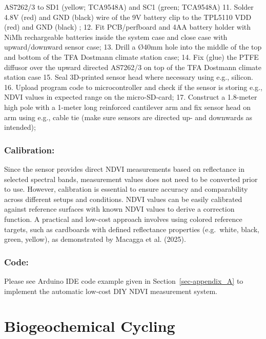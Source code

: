\documentclass[
  11pt,
  letterpaper,
]{book}
\begin{document}
AS7262/3 to SD1 (yellow; TCA9548A) and SC1 (green; TCA9548A) 11. Solder
4.8V (red) and GND (black) wire of the 9V battery clip to the TPL5110
VDD (red) and GND (black) ; 12. Fit PCB/perfboard and 4AA battery holder
with NiMh rechargeable batteries inside the system case and close case
with upward/downward sensor case; 13. Drill a Ø40mm hole into the middle
of the top and bottom of the TFA Dostmann climate station case; 14. Fix
(glue) the PTFE diffusor over the upward directed AS7262/3 on top of the
TFA Dostmann climate station case 15. Seal 3D-printed sensor head where
necessary using e.g., silicon. 16. Upload program code to
microcontroller and check if the sensor is storing e.g., NDVI values in
expected range on the micro-SD-card; 17. Construct a 1.8-meter high pole
with a 1-meter long reinforced cantilever arm and fix sensor head on arm
using e.g., cable tie (make sure sensors are directed up- and downwards
as intended);

\subsubsection{Calibration:}\label{sec-automatic-spectral-calibration}

Since the sensor provides direct NDVI measurements based on reflectance
in selected spectral bands, measurement values does not need to be
converted prior to use. However, calibration is essential to ensure
accuracy and comparability across different setups and conditions. NDVI
values can be easily calibrated against reference surfaces with known
NDVI values to derive a correction function. A practical and low-cost
approach involves using colored reference targets, such as cardboards
with defined reflectance properties (e.g.~white, black, green, yellow),
as demonstrated by Macagga et al. (2025).

\subsubsection{Code:}\label{sec-automatic-spectral-code}

Please see Arduino IDE code example given in
Section~\ref{sec-appendix_A} to implement the automatic low-cost DIY
NDVI measurement system.

\section{Biogeochemical Cycling}\label{sec-biogeochemical-cycling}
\end{document}
